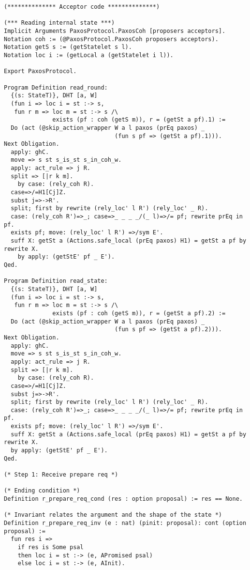 \begin{landscape}
\begin{multicols*}{2}
\begin{lstlisting}[style=SourceCodeListing]
(************** Acceptor code **************)

(*** Reading internal state ***)
Implicit Arguments PaxosProtocol.PaxosCoh [proposers acceptors].
Notation coh := (@PaxosProtocol.PaxosCoh proposers acceptors).
Notation getS s := (getStatelet s l).
Notation loc i := (getLocal a (getStatelet i l)).

Export PaxosProtocol.

Program Definition read_round:
  {(s: StateT)}, DHT [a, W]
  (fun i => loc i = st :-> s,
   fun r m => loc m = st :-> s /\
              exists (pf : coh (getS m)), r = (getSt a pf).1) :=
  Do (act (@skip_action_wrapper W a l paxos (prEq paxos) _
                                (fun s pf => (getSt a pf).1))).
Next Obligation.
  apply: ghC.
  move => s st s_is_st s_in_coh_w.
  apply: act_rule => j R.
  split => [|r k m].
    by case: (rely_coh R).
  case=>/=H1[Cj]Z.
  subst j=>->R'.
  split; first by rewrite (rely_loc' l R') (rely_loc' _ R).
  case: (rely_coh R')=>_; case=>_ _ _ _/(_ l)=>/= pf; rewrite prEq in pf.
  exists pf; move: (rely_loc' l R') =>/sym E'.
  suff X: getSt a (Actions.safe_local (prEq paxos) H1) = getSt a pf by rewrite X.
    by apply: (getStE' pf _ E').
Qed.

Program Definition read_state:
  {(s: StateT)}, DHT [a, W]
  (fun i => loc i = st :-> s,
   fun r m => loc m = st :-> s /\
              exists (pf : coh (getS m)), r = (getSt a pf).2) :=
  Do (act (@skip_action_wrapper W a l paxos (prEq paxos) _
                                (fun s pf => (getSt a pf).2))).
Next Obligation.
  apply: ghC.
  move => s st s_is_st s_in_coh_w.
  apply: act_rule => j R.
  split => [|r k m].
    by case: (rely_coh R).
  case=>/=H1[Cj]Z.
  subst j=>->R'.
  split; first by rewrite (rely_loc' l R') (rely_loc' _ R).
  case: (rely_coh R')=>_; case=>_ _ _ _/(_ l)=>/= pf; rewrite prEq in pf.
  exists pf; move: (rely_loc' l R') =>/sym E'.
  suff X: getSt a (Actions.safe_local (prEq paxos) H1) = getSt a pf by rewrite X.
  by apply: (getStE' pf _ E').
Qed.

(* Step 1: Receive prepare req *)

(* Ending condition *)
Definition r_prepare_req_cond (res : option proposal) := res == None.

(* Invariant relates the argument and the shape of the state *)
Definition r_prepare_req_inv (e : nat) (pinit: proposal): cont (option proposal) :=
  fun res i =>
    if res is Some psal
    then loc i = st :-> (e, APromised psal)
    else loc i = st :-> (e, AInit).


\end{lstlisting}
\end{multicols*}
\end{landscape}
